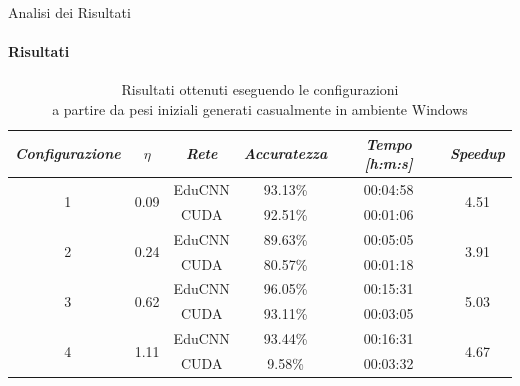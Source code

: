 \documentclass[
 ]{beamer}
\begin{document}
\begin{frame}{Analisi dei Risultati}
    \framesubtitle{Risultati}

           \begin{table}
            \centering
            \renewcommand\arraystretch{1.3}
            \small
            \begin{tabular}{| c | c | c | c | c | c |}
                \hline
                \emph{Configurazione} & $\eta$ & \emph{Rete} & \emph{Accuratezza} & \emph{Tempo [h:m:s]} & \emph{Speedup} \\
                \hline
                \multirow{2}{*}{1} & \multirow{2}{*}{0.09} & EduCNN & 93.13\% & 00:04:58 & \multirow{2}{*}{4.51} \\ \cline{3-5} 
                                   &                       & CUDA   & 92.51\% & 00:01:06 & \\
                \hline
                \multirow{2}{*}{2} & \multirow{2}{*}{0.24} & EduCNN & 89.63\% & 00:05:05 & \multirow{2}{*}{3.91} \\ \cline{3-5} 
                                   &                       & CUDA   & 80.57\% & 00:01:18  & \\
                \hline
                \multirow{2}{*}{3} & \multirow{2}{*}{0.62} & EduCNN & 96.05\% & 00:15:31 & \multirow{2}{*}{5.03} \\ \cline{3-5} 
                                   &                       & CUDA   & 93.11\% & 00:03:05 & \\
                \hline
                \multirow{2}{*}{4} & \multirow{2}{*}{1.11} & EduCNN & 93.44\% & 00:16:31 & \multirow{2}{*}{4.67} \\ \cline{3-5} 
                                   &                       & CUDA   & 9.58\%  & 00:03:32  & \\
                \hline
            \end{tabular}
            \caption                        
    {Risultati ottenuti eseguendo le configurazioni \\ a partire da pesi iniziali generati casualmente in ambiente Windows \endtabular}          
        \end{table}    
\end{frame}
\end{document}
